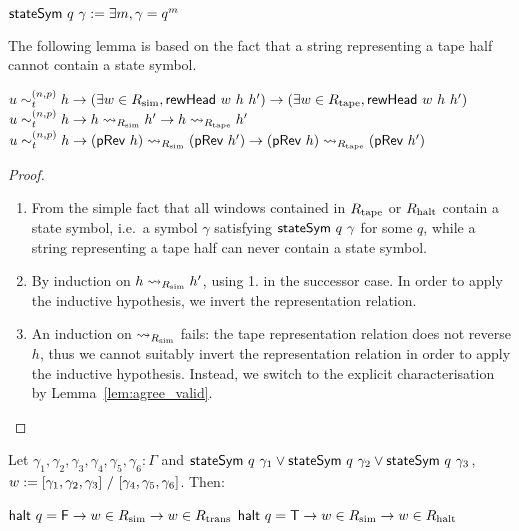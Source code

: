 \begin{definition}
  $\textsf{stateSym}~q~\gamma := \exists m, \gamma = q^m$
\end{definition}

The following lemma is based on the fact that a string representing a tape half cannot contain a state symbol.
\begin{lemma}\label{lem:sim_inv1}\leavevmode
  \begin{enumerate}
     $u \sim_t^{(n, p)} h \rightarrow (\exists w \in R_{\text{sim}}, \textsf{rewHead}~w~h~h') \rightarrow (\exists w \in R_{\text{tape}}, \textsf{rewHead}~w~h~h')$
     $u \sim_t^{(n, p)} h \rightarrow h \rightsquigarrow_{R_{\text{sim}}} h' \rightarrow h \rightsquigarrow_{R_{\text{tape}}} h'$
     $u \sim_t^{(n, p)} h \rightarrow (\textsf{pRev}~{h}) \rightsquigarrow_{R_{\text{sim}}} (\textsf{pRev}~{h'}) \rightarrow (\textsf{pRev}~{h}) \rightsquigarrow_{R_{\text{tape}}} (\textsf{pRev}~{h'})$
  \end{enumerate}
\end{lemma}
\begin{proof}
  \begin{enumerate}
    \item From the simple fact that all windows contained in $R_{\text{tape}}$ or $R_{\text{halt}}$ contain a state symbol, i.e.\ a symbol $\gamma$ satisfying $\textsf{stateSym}~q~\gamma$ for some $q$, while a string representing a tape half can never contain a state symbol.
    \item By induction on $h \rightsquigarrow_{R_{\text{sim}}} h'$, using 1. in the successor case. In order to apply the inductive hypothesis, we invert the representation relation.
    \item An induction on $\rightsquigarrow_{R_{\text{sim}}}$ fails: the tape representation relation does not reverse $h$, thus we cannot suitably invert the representation relation in order to apply the inductive hypothesis. Instead, we switch to the explicit characterisation by Lemma~\ref{lem:agree_valid}.
  \end{enumerate}
\end{proof}


\begin{lemma}\label{lem:sim_inv2}\leavevmode
  Let $\gamma_1, \gamma_2, \gamma_3, \gamma_4, \gamma_5, \gamma_6 : \Gamma$ and $\textsf{stateSym}~q~\gamma_1 \lor \textsf{stateSym}~q~\gamma_2 \lor \textsf{stateSym}~q~\gamma_3$, $w := [\gamma_1, \gamma_2, \gamma_3]~/~[\gamma_4, \gamma_5, \gamma_6]$. 
  Then:
  \begin{enumerate}
     $\textsf{halt}~q = \mathsf{F} \rightarrow w \in R_{\text{sim}} \rightarrow w \in R_{\text{trans}}$
     $\textsf{halt}~q = \mathsf{T} \rightarrow  w \in R_{\text{sim}} \rightarrow w \in R_{\text{halt}}$
  \end{enumerate}
\end{lemma}

